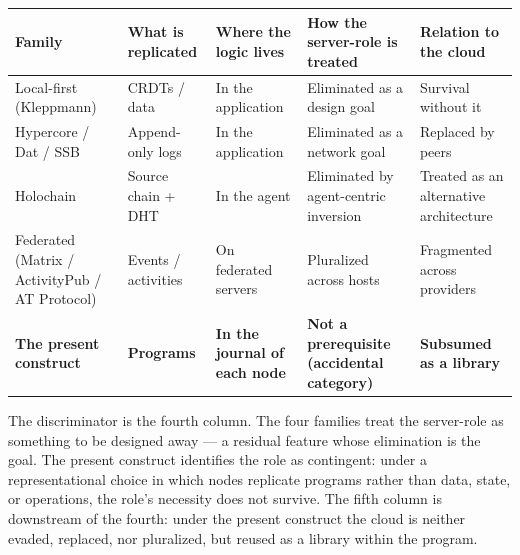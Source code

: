 \documentclass[
]{article}
\newcounter{none} %
\begin{document}
{\def\LTcaptype{none} %
\begin{longtable}[]{@{}
  >{\raggedright\arraybackslash}p{}
  >{\raggedright\arraybackslash}p{}
  >{\raggedright\arraybackslash}p{}
  >{\raggedright\arraybackslash}p{}
  >{\raggedright\arraybackslash}p{}@{}}
\toprule\noalign{}
\begin{minipage}[b]{\linewidth}\raggedright
Family
\end{minipage} & \begin{minipage}[b]{\linewidth}\raggedright
What is replicated
\end{minipage} & \begin{minipage}[b]{\linewidth}\raggedright
Where the logic lives
\end{minipage} & \begin{minipage}[b]{\linewidth}\raggedright
How the server-role is treated
\end{minipage} & \begin{minipage}[b]{\linewidth}\raggedright
Relation to the cloud
\end{minipage} \\
\midrule\noalign{}
\endhead
\bottomrule\noalign{}
\endlastfoot
Local-first (Kleppmann) & CRDTs / data & In the application & Eliminated
as a design goal & Survival without it \\
Hypercore / Dat / SSB & Append-only logs & In the application &
Eliminated as a network goal & Replaced by peers \\
Holochain & Source chain + DHT & In the agent & Eliminated by
agent-centric inversion & Treated as an alternative architecture \\
Federated (Matrix / ActivityPub / AT Protocol) & Events / activities &
On federated servers & Pluralized across hosts & Fragmented across
providers \\
\textbf{The present construct} & \textbf{Programs} & \textbf{In the
journal of each node} & \textbf{Not a prerequisite (accidental
category)} & \textbf{Subsumed as a library} \\
\end{longtable}
}

The discriminator is the fourth column. The four families treat the
server-role as something to be designed away --- a residual feature
whose elimination is the goal. The present construct identifies the role
as contingent: under a representational choice in which nodes replicate
programs rather than data, state, or operations, the role's necessity
does not survive. The fifth column is downstream of the fourth: under
the present construct the cloud is neither evaded, replaced, nor
pluralized, but reused as a library within the program.
\end{document}
